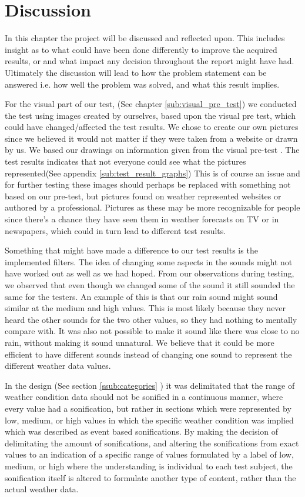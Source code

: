 
\section{Discussion} %
\label{sec:discussion}

In this chapter the project will be discussed and reflected upon. 
This includes insight as to what could have been done differently to improve the acquired results, or and what impact any decision throughout the report might have had. 
Ultimately the discussion will lead to how the problem statement can be answered i.e. how well the problem was solved, and what this result implies.

For the visual part of our test, (See chapter \ref{sub:visual_pre_test}) we conducted the test using images created by ourselves, based upon the visual pre test, which could have changed/affected the test results. We chose to create our own pictures since we believed it would not matter if they were taken from a website or drawn by us. We based our drawings on information given from the visual pre-test . The test results indicates that not everyone could see what the pictures represented(See appendix \ref{sub:test_result_graphs}) This is of course an issue and for further testing these images should perhaps be replaced with something not based on our pre-test, but pictures found on weather represented websites or authored by a professional. Pictures as these may be more recognizable for people since there’s a chance they have seen them in weather forecasts on TV or in newspapers, which could in turn lead to different test results.


Something that might have made a difference to our test results is the implemented filters. 
The idea of changing some aspects in the sounds might not have worked out as well as we had hoped.
From our observations during testing, we observed that even though we changed some of the sound it still sounded the same for the testers. 
An example of this is that our rain sound might sound similar at the medium and high values. 
This is most likely because they never heard the other sounds for the two other values, so they had nothing to mentally compare with. It was also not possible to make it sound like there was close to no rain, without making it sound unnatural. We believe that it could be more efficient to have different sounds instead of changing one sound to represent the different weather data values.


In the design (See section \ref{ssub:categories} ) it was delimitated that the range of weather condition data should not be sonified in a continuous manner, where every value had a sonification, but rather in sections which were represented by low, medium, or high values in which the specific weather condition was implied which was described as event based sonifications. 
By making the decision of delimitating the amount of sonifications, and altering the sonifications from exact values to an indication of a specific range of values formulated by a label of low, medium, or high where the understanding is individual to each test subject, the sonification itself is altered to formulate another type of content, rather than the actual weather data. 


